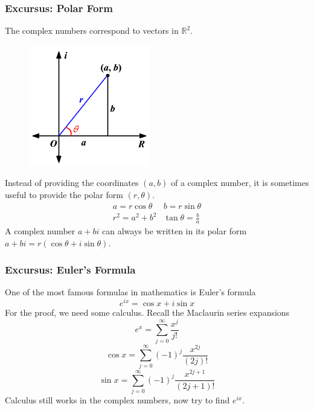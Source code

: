 \documentclass[xcolor=dvipsnames]{beamer}
\begin{document}
\begin{frame}
  \frametitle{Excursus: Polar Form}
  The complex numbers correspond to vectors in $\mathbb{R}^{2}$.
    \begin{figure}[h]
    \includegraphics[scale=0.32]{./diagrams/polar.png}
  \end{figure}
Instead of providing the coordinates $(a,b)$ of a complex number, it
is sometimes useful to provide the \alert{polar form} $(r,\theta)$.
\begin{equation}
  \label{eq:eekaerai}
  \begin{array}{ll}
    a=r\cos\theta & b=r\sin\theta \\
    r^{2}=a^{2}+b^{2} & \tan\theta=\frac{b}{a}
  \end{array}
\end{equation}
A complex number $a+bi$ can always be written in its polar form $a+bi=r(\cos\theta+i\sin\theta)$.
\end{frame}

\begin{frame}
  \frametitle{Excursus: Euler's Formula}
  One of the most famous formulas in mathematics is Euler's formula
  \begin{equation}
    \label{eq:kiagaiga}
    e^{ix}=\cos{}x+i\sin{}x
  \end{equation}
For the proof, we need some calculus. Recall the Maclaurin series
expansions
\begin{equation}
  \label{eq:uthairoj}
  e^{x}=\sum_{j=0}^{\infty}\frac{x^{j}}{j!}
\end{equation}
\begin{equation}
  \label{eq:eepiewez}
  \cos{}x=\sum_{j=0}^{\infty}(-1)^{j}\frac{x^{2j}}{(2j)!}
\end{equation}
\begin{equation}
  \label{eq:mohhaich}
  \sin{}x=\sum_{j=0}^{\infty}(-1)^{j}\frac{x^{2j+1}}{(2j+1)!}
\end{equation}
Calculus still works in the complex numbers, now try to find $e^{ix}$. 
\end{frame}
\end{document}
